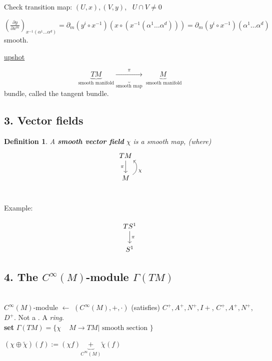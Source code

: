 \documentclass[10pt]{amsart}
\newtheorem{definition}{Definition}
\begin{document}
\begin{multicols*}{2}
\begin{enumerate}
		Check transition map: $(U, x), (V,y)$, \, $U\cap V \neq 0$
		
		$\left( \frac{ \partial y }{ \partial x^m } \right)_{x^{-1}(\alpha^1 \dots \alpha^d)} = \partial_m (y^i \circ x^{-1} )( x\circ (x^{-1}(\alpha^1 \dots \alpha^d) ) ) = \partial_m (y^i \circ x^{-1} )( \alpha^1 \dots \alpha^d)$ smooth.  
		
		\underline{upshot}
		
		\[
		\underbrace{TM}_{\text{smooth manifold}} \underbrace{ \xrightarrow{\pi} }_{\text{smooth map} } \underbrace{M}_{\text{ smooth manifold} }
		\]
		bundle, called the tangent bundle.
		
	\end{enumerate}
	
	\subsection*{3. Vector fields}
	
	\begin{definition}
		A \textbf{smooth vector field} $\chi$ is a \emph{smooth} map, (where)
		\[
\begin{tikzcd}
TM \arrow[d, swap, "\pi"] \\
M \arrow[bend right=60,swap]{u}{\chi} \\
\end{tikzcd}		
	\]
	\end{definition}

Example:

\[
\begin{tikzcd}
	TS^1 \arrow{d}{\pi} \\
	S^1 
\end{tikzcd}
\]
	
	\subsection*{4. The $C^{\infty}(M)$-module $\Gamma(TM)$}
	
	\quad \\
	$C^{\infty}(M)$-module $ \leftarrow$ $(C^{\infty}(M), + , \cdot)$
	(satisfies) $C^+, A^+, N^+, I+$, $C^+, A^+, N^+$, $D^+$. Not a . A \emph{ring}. \\
	
	
	\textbf{set} $\Gamma(TM) = \lbrace \chi \quad \, M \to TM | \text{ smooth section } \rbrace$
	
	$(\chi \oplus \widetilde{\chi})(f) := (\chi f)  \underbrace{+}_{C^{\infty}(M)} \widetilde{\chi}(f)$ \\
	

\end{multicols*}
\end{document}
